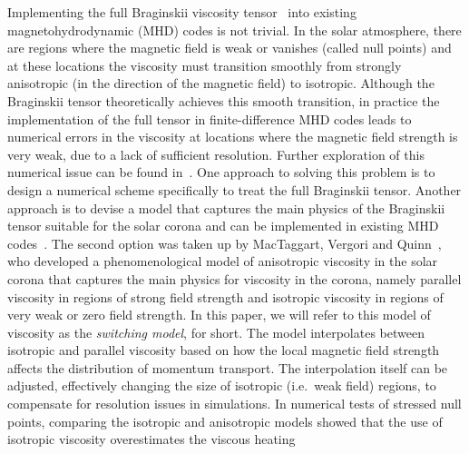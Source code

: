 Implementing the full Braginskii viscosity
tensor~\cite{braginskiiTransportProcessesPlasma1965} into existing
magnetohydrodynamic (MHD) codes is not trivial. In the solar
atmosphere, there are regions where the magnetic field is weak or
vanishes (called null points) and at these locations the viscosity must
transition smoothly from strongly anisotropic (in the direction of the
magnetic field) to isotropic. Although the Braginskii tensor theoretically achieves
this smooth transition, in practice the implementation
of the full tensor in finite-difference MHD codes leads to numerical
errors in the viscosity at locations where the magnetic field strength
is very weak, due to a lack of sufficient resolution. Further
exploration of this numerical issue can be found
in~\cite{mactaggartBraginskiiMagnetohydrodynamicsArbitrary2017}. One
approach to solving this problem is to design a numerical scheme
specifically to treat the full Braginskii tensor. Another approach is
to devise a model that captures the main physics of the Braginskii
tensor suitable for the solar corona and can be implemented in
existing MHD codes~\cite{hollwegViscosityMagnetizedPlasma1985}. The
second option was taken up by MacTaggart, Vergori and
Quinn~\cite{mactaggartBraginskiiMagnetohydrodynamicsArbitrary2017},
who developed a phenomenological model of anisotropic viscosity in the
solar corona that captures the main physics for viscosity in the
corona, namely parallel viscosity in regions of strong field strength and isotropic viscosity in regions of very weak or zero field strength. In this paper, we will refer to this model of viscosity as the \textit{switching model}, for short. The model interpolates between isotropic and parallel viscosity based on how the local magnetic field strength affects the distribution of momentum transport. The interpolation itself can be adjusted, effectively changing the size of isotropic (i.e.\ weak field) regions, to compensate for resolution issues in simulations. In numerical tests of stressed null points, comparing the isotropic and anisotropic models showed that the use of isotropic viscosity overestimates the viscous heating 

